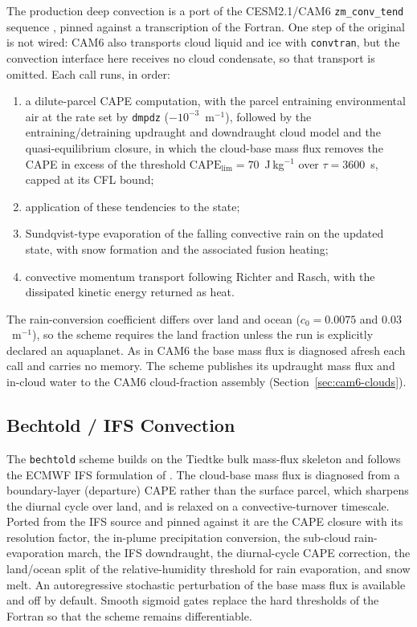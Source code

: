 \documentclass[11pt,twoside]{report}
\begin{document}
The production deep convection is a port of the CESM2.1/CAM6
\texttt{zm\_conv\_tend} sequence \citep{ZhangMcFarlane1995}, pinned against
a transcription of the Fortran.  One step of the original is not wired: CAM6
also transports cloud liquid and ice with \texttt{convtran}, but the
convection interface here receives no cloud condensate, so that transport is
omitted.  Each call runs, in order:
\begin{enumerate}[nosep]
  \item a dilute-parcel CAPE computation, with the parcel entraining
    environmental air at the rate set by \texttt{dmpdz}
    ($-10^{-3}$~m$^{-1}$), followed by the entraining/detraining updraught
    and downdraught cloud model and the quasi-equilibrium closure, in which
    the cloud-base mass flux removes the CAPE in excess of the threshold
    $\mathrm{CAPE}_{\mathrm{lim}}=70$~J\,kg$^{-1}$ over
    $\tau=3600$~s, capped at its CFL bound;
  \item application of these tendencies to the state;
  \item Sundqvist-type evaporation of the falling convective rain on the
    updated state, with snow formation and the associated fusion heating;
  \item convective momentum transport following Richter and Rasch, with the
    dissipated kinetic energy returned as heat.
\end{enumerate}
The rain-conversion coefficient differs over land and ocean
($c_0=0.0075$ and $0.03$~m$^{-1}$), so the scheme requires the land fraction
unless the run is explicitly declared an aquaplanet.  As in CAM6 the base mass
flux is diagnosed afresh each call and carries no memory.  The scheme
publishes its updraught mass flux and in-cloud water to the CAM6
cloud-fraction assembly (Section~\ref{sec:cam6-clouds}).

\subsection{Bechtold / IFS Convection}
\label{sec:bechtold}

The \texttt{bechtold} scheme builds on the Tiedtke bulk mass-flux skeleton
and follows the ECMWF IFS formulation of \citet{Bechtold2008}.  The
cloud-base mass flux is diagnosed from a boundary-layer (departure) CAPE
rather than the surface parcel, which sharpens the diurnal cycle over land,
and is relaxed on a convective-turnover timescale.  Ported from the IFS source
and pinned against it are the CAPE closure with its resolution factor, the
in-plume precipitation conversion, the sub-cloud rain-evaporation march, the
IFS downdraught, the diurnal-cycle CAPE correction, the land/ocean split of the
relative-humidity threshold for rain evaporation, and snow melt.  An
autoregressive stochastic perturbation of the base mass flux
\citep{Bechtold2014} is available and off by default.  Smooth sigmoid gates
replace the hard thresholds of the Fortran so that the scheme remains
differentiable.
\end{document}
